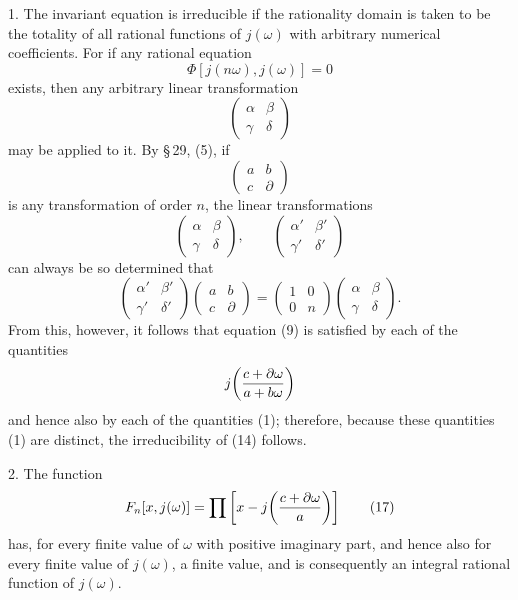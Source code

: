 \documentclass[11pt]{article}
\begin{document}
1. The invariant equation is irreducible if the rationality domain is taken to be the totality of all rational functions of $j(\omega)$ with arbitrary numerical coefficients. For if any rational equation
\begin{equation}
\Phi[j(n\omega),j(\omega)]=0
\tag{15}
\end{equation}
exists, then any arbitrary linear transformation
\[
\begin{pmatrix}\alpha&\beta\\\gamma&\delta\end{pmatrix}
\]
may be applied to it. By \S\,29, (5), if
\[
\begin{pmatrix}a&b\\c&\partial\end{pmatrix}
\]
is any transformation of order $n$, the linear transformations
\[
\begin{pmatrix}\alpha&\beta\\\gamma&\delta\end{pmatrix},
\qquad
\begin{pmatrix}\alpha'&\beta'\\\gamma'&\delta'\end{pmatrix}
\]
can always be so determined that
\begin{equation}
\begin{pmatrix}\alpha'&\beta'\\\gamma'&\delta'\end{pmatrix}
\begin{pmatrix}a&b\\c&\partial\end{pmatrix}
=
\begin{pmatrix}1&0\\0&n\end{pmatrix}
\begin{pmatrix}\alpha&\beta\\\gamma&\delta\end{pmatrix}.
\tag{16}
\end{equation}
From this, however, it follows that equation (9) is satisfied by each of the quantities
\[
j\!\left({c+\partial\omega\over a+b\omega}\right)
\]
and hence also by each of the quantities (1); therefore, because these quantities (1) are distinct, the irreducibility of (14) follows.

2. The function
\begin{equation}
F_n[x,j(\omega)]=\prod\left[x-j\!\left({c+\partial\omega\over a}\right)\right]
\tag{17}
\end{equation}
has, for every finite value of $\omega$ with positive imaginary part, and hence also for every finite value of $j(\omega)$, a finite value, and is consequently an integral rational function of $j(\omega)$.
\end{document}
